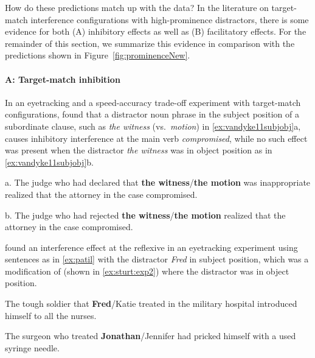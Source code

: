 \documentclass{cambridge7A}\usepackage[]{graphicx}\usepackage[]{color}
\begin{document}
How do these predictions match up with the data?
In the literature on target-match interference configurations with high-prominence distractors, there is some evidence for both (A) inhibitory effects as well as (B) facilitatory effects. 
For the remainder of this section, we summarize this evidence in comparison with the predictions shown in Figure~\ref{fig:prominenceNew}.

\paragraph{A: Target-match inhibition}
In an eyetracking and a speed-accuracy trade-off experiment with target-match configurations, \cite{VanDykeMcElree2011} found that a distractor noun phrase in the subject position of a subordinate clause, such as \textit{the witness} (vs.\ \textit{motion}) in \ref{ex:vandyke11subjobj}a, causes inhibitory interference at the main verb \textit{compromised}, while no such effect was present when the distractor \textit{the witness} was in object position as in \ref{ex:vandyke11subjobj}b.

\begin{exe} 
\ex \label{ex:vandyke11subjobj}
\begin{xlist}
\item[a.] The judge who had declared that \textbf{the witness}/\textbf{the motion} was inappropriate realized that the attorney in the case compromised.
\item[b.] The judge who had rejected \textbf{the witness}/\textbf{the motion} realized that the attorney in the case compromised.
\end{xlist}
\end{exe}  

\cite{PatilVasishthLewis2016} found an interference effect at the reflexive in an eyetracking experiment using sentences as in \ref{ex:patil} with the distractor \textit{Fred} in subject position, which was a modification of \cite{Sturt2003} (shown in \ref{ex:sturt:exp2}) where the distractor was in object position.

\begin{exe} 
\ex\label{ex:patil}
The tough soldier that \textbf{Fred}/Katie treated in the military hospital introduced himself to all the nurses.
\end{exe}  

\begin{exe} 
\ex\label{ex:sturt:exp2}
The surgeon who treated \textbf{Jonathan}/Jennifer had pricked himself with a used syringe needle. 
\end{exe}  
\end{document}

